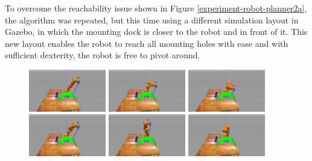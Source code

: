 To overcome the reachability issue shown in Figure \ref{experiment-robot-planner2a}, the algorithm was repeated, but this time using a different simulation layout 
in Gazebo, in which the mounting dock is closer to the robot and in front of it. This new layout enables the robot to reach all mounting holes with ease and 
with sufficient dexterity, the robot is free to pivot around.

\begin{center}
\begin{figure}[H]
\centering
\includegraphics[width=0.3\textwidth]{images/robot_planner2b/robot_planner2b_1}
\includegraphics[width=0.3\textwidth]{images/robot_planner2b/robot_planner2b_2}
\includegraphics[width=0.3\textwidth]{images/robot_planner2b/robot_planner2b_3}\\
\includegraphics[width=0.3\textwidth]{images/robot_planner2b/robot_planner2b_4}
\includegraphics[width=0.3\textwidth]{images/robot_planner2b/robot_planner2b_5}
\includegraphics[width=0.3\textwidth]{images/robot_planner2b/robot_planner2b_6}\\

\end{figure}
\end{center}
